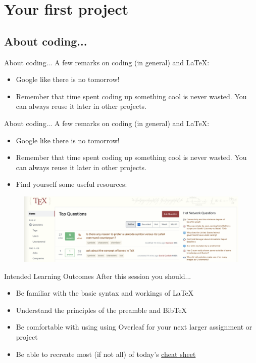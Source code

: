 \documentclass[10pt]{beamer}
\begin{document}
\section{Your first project}
\subsection{About coding...}
\begin{frame}{About coding...}
    A few \alert{remarks on coding} (in general) and \LaTeX:
    \begin{itemize}
        \item Google like there is no tomorrow!         
        \item Remember that time spent \alert{coding up something cool} is never wasted. You can always reuse it later in other projects. 
    \end{itemize}
\end{frame}

\begin{frame}{About coding...}
    A few \alert{remarks on coding} (in general) and \LaTeX:
    \begin{itemize}
        \item Google like there is no tomorrow! 
        \item Remember that time spent \alert{coding up something cool} is never wasted. You can always reuse it later in other projects. 
        \item Find yourself some useful resources:
    \end{itemize}
    \begin{figure}
        \centering 
        \includegraphics[width = \textwidth]{stackexchange.png}
    \end{figure} 
\end{frame}

\begin{frame}{Intended Learning Outcomes}
    After this session you should... 
\begin{itemize}
    \item<2-> Be \alert{familiar} with the basic syntax and workings of \LaTeX
    \item<3-> Understand the principles of the \alert{preamble} and \alert{BibTeX}
    \item<4-> Be comfortable with using \alert{using Overleaf} for your next larger assignment or project 
    \item<5-> Be able to recreate \alert{most (if not all)} of today's \href{https://github.com/carlepless/latex-introduction/blob/main/cheat-sheet/cheat-sheet.tex}{\color{blue}cheat sheet}
\end{itemize}
\end{frame}
\end{document}
